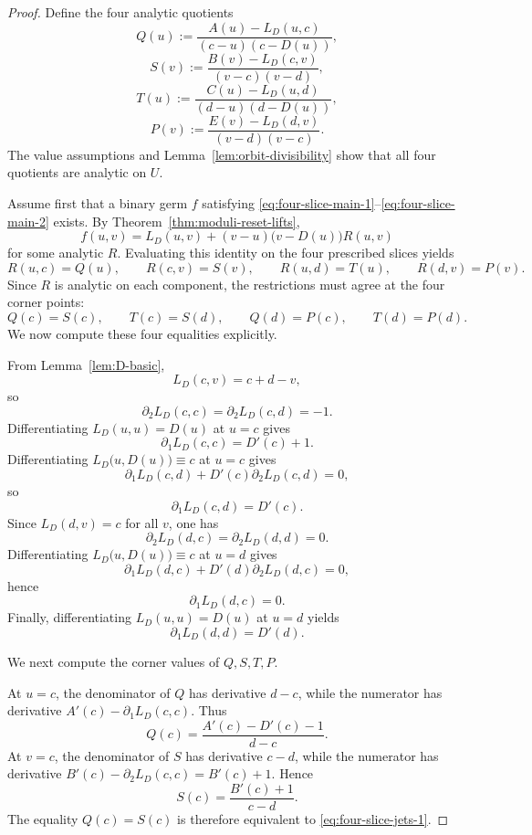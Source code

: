 \documentclass[11pt]{amsart}
\numberwithin{equation}{section}
\theoremstyle{remark}
\theoremstyle{definition}
\begin{document}
\begin{proof}
Define the four analytic quotients
\begin{equation}\label{eq:Q-four}
Q(u):=\frac{A(u)-L_D(u,c)}{(c-u)(c-D(u))},
\end{equation}
\begin{equation}\label{eq:S-four}
S(v):=\frac{B(v)-L_D(c,v)}{(v-c)(v-d)},
\end{equation}
\begin{equation}\label{eq:T-four}
T(u):=\frac{C(u)-L_D(u,d)}{(d-u)(d-D(u))},
\end{equation}
\begin{equation}\label{eq:P-four}
P(v):=\frac{E(v)-L_D(d,v)}{(v-d)(v-c)}.
\end{equation}
The value assumptions and Lemma~\ref{lem:orbit-divisibility} show that all four quotients are analytic on $U$.

Assume first that a binary germ $f$ satisfying \eqref{eq:four-slice-main-1}--\eqref{eq:four-slice-main-2} exists. By Theorem~\ref{thm:moduli-reset-lifts},
\[
f(u,v)=L_D(u,v)+(v-u)\bigl(v-D(u)\bigr)R(u,v)
\]
for some analytic $R$. Evaluating this identity on the four prescribed slices yields
\[
R(u,c)=Q(u),\qquad R(c,v)=S(v),\qquad R(u,d)=T(u),\qquad R(d,v)=P(v).
\]
Since $R$ is analytic on each component, the restrictions must agree at the four corner points:
\begin{equation}\label{eq:corner-compatibilities}
Q(c)=S(c),\qquad T(c)=S(d),\qquad Q(d)=P(c),\qquad T(d)=P(d).
\end{equation}
We now compute these four equalities explicitly.

From Lemma~\ref{lem:D-basic},
\[
L_D(c,v)=c+d-v,
\]
so
\[
\partial_2L_D(c,c)=\partial_2L_D(c,d)=-1.
\]
Differentiating $L_D(u,u)=D(u)$ at $u=c$ gives
\[
\partial_1L_D(c,c)=D'(c)+1.
\]
Differentiating $L_D\bigl(u,D(u)\bigr)\equiv c$ at $u=c$ gives
\[
\partial_1L_D(c,d)+D'(c)\partial_2L_D(c,d)=0,
\]
so
\[
\partial_1L_D(c,d)=D'(c).
\]
Since $L_D(d,v)=c$ for all $v$, one has
\[
\partial_2L_D(d,c)=\partial_2L_D(d,d)=0.
\]
Differentiating $L_D\bigl(u,D(u)\bigr)\equiv c$ at $u=d$ gives
\[
\partial_1L_D(d,c)+D'(d)\partial_2L_D(d,c)=0,
\]
hence
\[
\partial_1L_D(d,c)=0.
\]
Finally, differentiating $L_D(u,u)=D(u)$ at $u=d$ yields
\[
\partial_1L_D(d,d)=D'(d).
\]

We next compute the corner values of $Q,S,T,P$.

At $u=c$, the denominator of $Q$ has derivative $d-c$, while the numerator has derivative $A'(c)-\partial_1L_D(c,c)$. Thus
\begin{equation}\label{eq:Qccalc}
Q(c)=\frac{A'(c)-D'(c)-1}{d-c}.
\end{equation}
At $v=c$, the denominator of $S$ has derivative $c-d$, while the numerator has derivative $B'(c)-\partial_2L_D(c,c)=B'(c)+1$. Hence
\begin{equation}\label{eq:Sccalc}
S(c)=\frac{B'(c)+1}{c-d}.
\end{equation}
The equality $Q(c)=S(c)$ is therefore equivalent to \eqref{eq:four-slice-jets-1}.


\end{proof}
\end{document}
